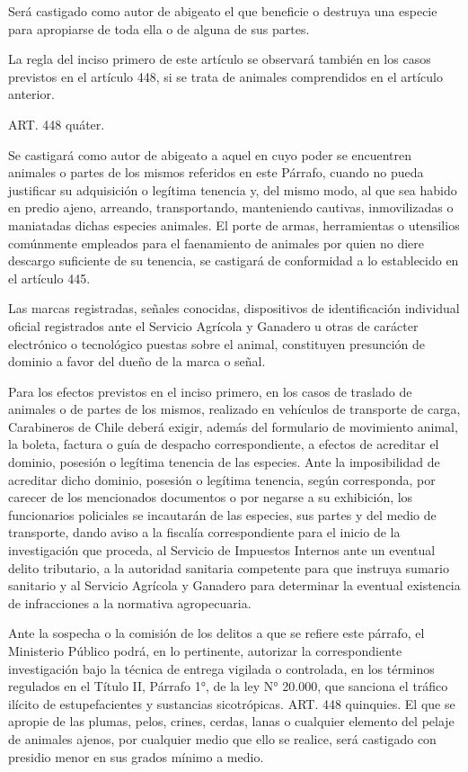     Será castigado como autor de abigeato el que beneficie o destruya una especie para apropiarse de toda ella o de alguna de sus partes.

    La regla del inciso primero de este artículo se observará también en los casos previstos en el artículo 448, si se trata de animales comprendidos en el artículo anterior.

    ART. 448 quáter.

    Se castigará como autor de abigeato a aquel en cuyo poder se encuentren animales o partes de los mismos referidos en este Párrafo, cuando no pueda justificar su adquisición o legítima tenencia y, del mismo modo, al que sea habido en predio ajeno, arreando, transportando, manteniendo cautivas, inmovilizadas o maniatadas dichas especies animales. El porte de armas, herramientas o utensilios comúnmente empleados para el faenamiento de animales por quien no diere descargo suficiente de su tenencia, se castigará de conformidad a lo establecido en el artículo 445.

    Las marcas registradas, señales conocidas, dispositivos de identificación individual oficial registrados ante el Servicio Agrícola y Ganadero u otras de carácter electrónico o tecnológico puestas sobre el animal, constituyen presunción de dominio a favor del dueño de la marca o señal.

    Para los efectos previstos en el inciso primero, en los casos de traslado de animales o de partes de los mismos, realizado en vehículos de transporte de carga, Carabineros de Chile deberá exigir, además del formulario de movimiento animal, la boleta, factura o guía de despacho correspondiente, a efectos de acreditar el dominio, posesión o legítima tenencia de las especies. Ante la imposibilidad de acreditar dicho dominio, posesión o legítima tenencia, según corresponda, por carecer de los mencionados documentos o por negarse a su exhibición, los funcionarios policiales se incautarán de las especies, sus partes y del medio de transporte, dando aviso a la fiscalía correspondiente para el inicio de la investigación que proceda, al Servicio de Impuestos Internos ante un eventual delito tributario, a la autoridad sanitaria competente para que instruya sumario sanitario y al Servicio Agrícola y Ganadero para determinar la eventual existencia de infracciones a la normativa agropecuaria.
   
    Ante la sospecha o la comisión de los delitos a que se refiere este párrafo, el Ministerio Público podrá, en lo pertinente, autorizar la correspondiente investigación bajo la técnica de entrega vigilada o controlada, en los términos regulados en el Título II, Párrafo 1°, de la ley N° 20.000, que sanciona el tráfico ilícito de estupefacientes y sustancias sicotrópicas.
    ART. 448 quinquies.
    El que se apropie de las plumas, pelos, crines, cerdas, lanas o cualquier elemento del pelaje de animales ajenos, por cualquier medio que ello se realice, será castigado con presidio menor en sus grados mínimo a medio.


